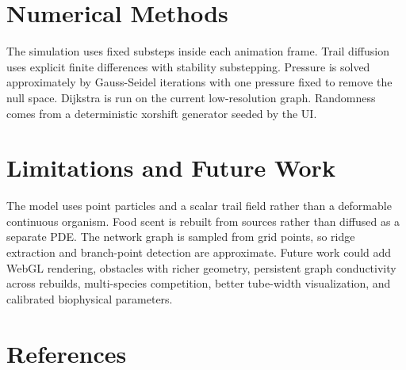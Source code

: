 \documentclass[11pt]{article}
\begin{document}
\section{Numerical Methods}
The simulation uses fixed substeps inside each animation frame. Trail diffusion
uses explicit finite differences with stability substepping. Pressure is solved
approximately by Gauss-Seidel iterations with one pressure fixed to remove the
null space. Dijkstra is run on the current low-resolution graph. Randomness comes
from a deterministic xorshift generator seeded by the UI.

\section{Limitations and Future Work}
The model uses point particles and a scalar trail field rather than a deformable
continuous organism. Food scent is rebuilt from sources rather than diffused as a
separate PDE. The network graph is sampled from grid points, so ridge extraction
and branch-point detection are approximate. Future work could add WebGL rendering,
obstacles with richer geometry, persistent graph conductivity across rebuilds,
multi-species competition, better tube-width visualization, and calibrated
biophysical parameters.

\section{References}
\nocite{*}


\end{document}
